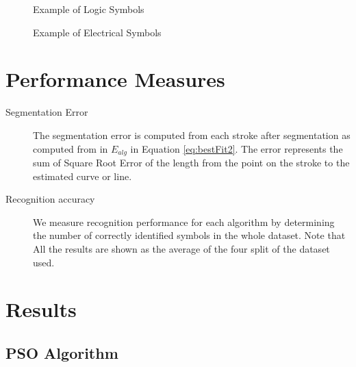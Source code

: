 \begin{figure}[]\centering
{}
	\caption{Example of Logic Symbols}
	\label{fig:LogicSet}
\end{figure}
\begin{figure}[]\centering
{}
	\caption{Example of Electrical Symbols}
	\label{fig:ElectSet}
\end{figure}



\section{Performance Measures }
\label{sec:PerformanceMeasures}

\begin{description}
	\item[Segmentation Error] The segmentation error is computed from each stroke after segmentation as computed from in $E_{alg}$ in Equation \ref{eq:bestFit2}. The error represents the sum of Square Root Error of the length from the point on the stroke to the estimated curve or line. 
	  
	\item [Recognition accuracy] We measure recognition performance for each algorithm by determining the number of correctly identified symbols in the whole dataset. Note that All the results are shown as the average of the four split of the dataset used. 
\end{description}

 

\section{Results}
\label{sec:ResultsDetails}

\subsection{PSO Algorithm}
\label{sec:PSO}

